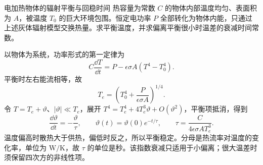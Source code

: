 \begin{origexamplebox}{电加热物体的辐射平衡与回稳时间}\label{ch15:ex:teaching-radiation}
热容量为常数 $C$ 的物体内部温度均匀、表面积为 $A$，被温度 $T_0$ 的巨大环境包围。恒定电功率 $P$ 全部转化为物体内能，只通过上述灰体辐射模型交换热量。求平衡温度，并求偏离平衡很小时温差的衰减时间常数。
\end{origexamplebox}
\begin{xesolution}
以物体为系统，功率形式的第一定律为
\[
 C\frac{\dd T}{\dd t}=P-\epsilon\sigma A(T^4-T_0^4).
\]
平衡时左右能流相等，故
\[
 T_e=\left(T_0^4+\frac{P}{\epsilon\sigma A}\right)^{1/4}.
\]
令 $T=T_e+\vartheta$、$|\vartheta|\ll T_e$，展开 $T^4=T_e^4+4T_e^3\vartheta+O(\vartheta^2)$，平衡项抵消，得到
\[
 \frac{\dd\vartheta}{\dd t}=-\frac{\vartheta}{\tau},\qquad
 \vartheta(t)=\vartheta(0)e^{-t/\tau},\qquad
 \tau=\frac{C}{4\epsilon\sigma AT_e^3}.
\]
温度偏高时散热大于供热，偏低时反之，所以平衡稳定。分母是热流率对温度的变化率，单位为 $\mathrm{W/K}$，故 $\tau$ 的单位是秒。该指数衰减只适用于小偏离；很大温差时须保留四次方的非线性项。
\end{xesolution}
